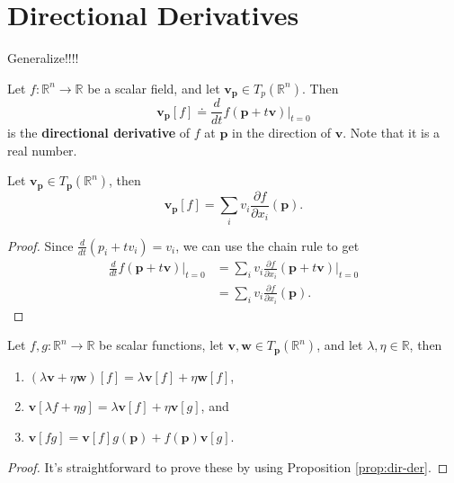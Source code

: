 \documentclass[10pt]{report}
\begin{document}

\section{Directional Derivatives}

{\color{red}Generalize!!!!}

\begin{defn}
	Let $f:\mathbb{R}^n \to \mathbb{R}$ be a scalar field, and let $\mathbf{v}_{\mathbf{p}} \in T_p(\mathbb{R}^n)$. Then
	\[
		\mathbf{v}_{\mathbf{p}}[f] \doteq \frac{d }{d t} f(\mathbf{p}+t\mathbf{v}) \Big|_{t=0}
\] is the \textbf{directional derivative} of $f$ at $\mathbf{p}$ in the direction of $\mathbf{v}$. Note that it is a real number.
\end{defn}

\begin{prop}
	\label{prop:dir-der}
	Let $\mathbf{v}_\mathbf{p} \in T_\mathbf{p}(\mathbb{R}^n)$, then
	\[
		\mathbf{v}_{\mathbf{p}}[f] = \sum_i v_i \frac{\partial f}{\partial x_i} (\mathbf{p}).
	\] 
\end{prop}
\begin{proof}
	Since $\frac{d }{d t} (p_i + tv_i) = v_i$, we can use the chain rule to get
	\begin{align*}
		\frac{d }{d t} f(\mathbf{p}+t\mathbf{v}) \Big|_{t=0} &= \sum_{i} v_i \frac{\partial f}{\partial x_i} (\mathbf{p}+t\mathbf{v}) \Big|_{t=0} \\
						   &= \sum_i v_i \frac{\partial f}{\partial x_i} (\mathbf{p}).
	\end{align*}
\end{proof}

\begin{thrm}
	\label{thrm:props-of-dir-der}
	Let $f,g:\mathbb{R}^n \to \mathbb{R}$ be scalar functions, let $\mathbf{v},\mathbf{w} \in T_\mathbf{p}(\mathbb{R}^n)$, and let $\lambda,\eta\in\mathbb{R}$, then
	\begin{enumerate}
		\item $(\lambda \mathbf{v} + \eta \mathbf{w})[f] = \lambda \mathbf{v}[f] + \eta \mathbf{w}[f]$,
		\item $\mathbf{v}[\lambda f + \eta g] = \lambda \mathbf{v}[f] + \eta \mathbf{v}[g]$, and
		\item $\mathbf{v}[fg] = \mathbf{v}[f] g(\mathbf{p}) + f(\mathbf{p}) \mathbf{v}[g]$.
	\end{enumerate}
\end{thrm}
\begin{proof}
	It's straightforward to prove these by using Proposition \ref{prop:dir-der}.
\end{proof}
\end{document}
